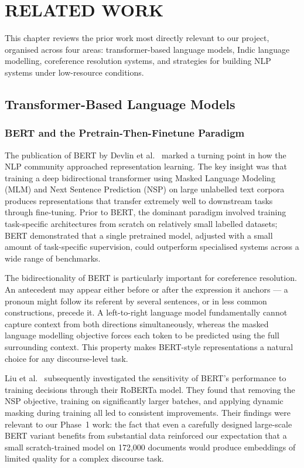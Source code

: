 \documentclass[12pt,a4paper]{report}
\begin{document}
\chapter{RELATED WORK}

This chapter reviews the prior work most directly relevant to our project, organised across four areas: transformer-based language models, Indic language modelling, coreference resolution systems, and strategies for building NLP systems under low-resource conditions.

\section{Transformer-Based Language Models}

\subsection{BERT and the Pretrain-Then-Finetune Paradigm}

The publication of BERT by Devlin et al.\ \cite{devlin2018bert} marked a turning point in how the NLP community approached representation learning. The key insight was that training a deep bidirectional transformer using Masked Language Modeling (MLM) and Next Sentence Prediction (NSP) on large unlabelled text corpora produces representations that transfer extremely well to downstream tasks through fine-tuning. Prior to BERT, the dominant paradigm involved training task-specific architectures from scratch on relatively small labelled datasets; BERT demonstrated that a single pretrained model, adjusted with a small amount of task-specific supervision, could outperform specialised systems across a wide range of benchmarks.

The bidirectionality of BERT is particularly important for coreference resolution. An antecedent may appear either before or after the expression it anchors --- a pronoun might follow its referent by several sentences, or in less common constructions, precede it. A left-to-right language model fundamentally cannot capture context from both directions simultaneously, whereas the masked language modelling objective forces each token to be predicted using the full surrounding context. This property makes BERT-style representations a natural choice for any discourse-level task.

Liu et al.\ \cite{liu2019roberta} subsequently investigated the sensitivity of BERT's performance to training decisions through their RoBERTa model. They found that removing the NSP objective, training on significantly larger batches, and applying dynamic masking during training all led to consistent improvements. Their findings were relevant to our Phase~1 work: the fact that even a carefully designed large-scale BERT variant benefits from substantial data reinforced our expectation that a small scratch-trained model on 172,000 documents would produce embeddings of limited quality for a complex discourse task.
\end{document}
